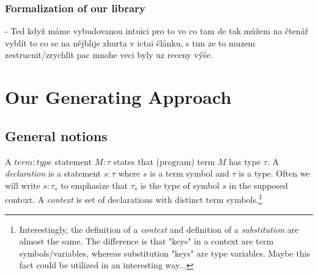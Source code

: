 \documentclass[a4paper,oneside]{memoir}
\begin{document}
\subsection{Formalization of our library}

- Ted když máme vybudovanou intuici pro to vo co tam de tak můžem na čtenář vyblít to co se na nějblije zhurta v ictai článku, s tim ze to muzem zestrucnit/zrychlit pac mnohe veci byly uz receny výše.


	
	
%
%
%




\chapter{Our Generating Approach}

\section{General notions}

\begin{definition}
A $\mathit{term:type}$ statement $\mathit{M}:\mathit{\tau}$ states that (program) term $M$ has type $\tau$.   
A \textit{declaration} is a statement $s : \tau$ where $s$ is a term symbol and $\tau$ is a type.
Often we will write $s : \tau_s$ to emphasize that $\tau_s$ is the type of symbol $s$ in the supposed context.
A \textit{context} is set of declarations with distinct term symbols.\footnote{Interestingly, the definition of a \textit{context} and definition of a \textit{substitution} are almost the same. The difference is that "keys" in a context are term symbols/variables, whereas substitution "keys" are type variables. Maybe this fact could be utilized in an interesting way...}
\end{definition}
\end{document}
